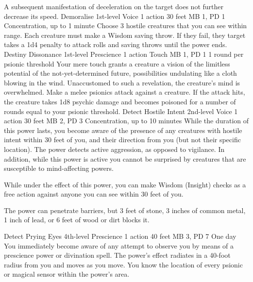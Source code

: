 A subsequent manifestation of deceleration on the target does
not further decrease its speed.
\DndPowerHeader%
    {Demoralise\label{pwr:demoralise}}
    {1st-level Voice}
    {1 action}
    {30 feet}
    {MB 1, PD 1}
    {Concentration, up to 1 minute}
Choose 3 hostile creatures that you can see
within range. Each creature must make a Wisdom saving throw.
If they fail, they target takes a 1d4 penalty to attack rolls
and saving throws until the power ends.
\DndPowerHeader%
    {Destiny Dissonance\label{pwr:destiny_dissonance}}
    {1st-level Prescience}
    {1 action}
    {Touch}
    {MB 1, PD 1}
    {1 round per psionic threshold}
Your mere touch grants a creature a vision
of the limitless potential of the not-yet-determined future,
possibilities undulating like a cloth blowing in the wind.
Unaccustomed to such a revelation, the creature's mind is
overwhelmed. Make a melee psionics attack against a creature.
If the attack hits, the creature takes 1d8 psychic damage
and becomes poisoned for a number of rounds equal to your
psionic threshold.
\DndPowerHeader%
    {Detect Hostile Intent\label{pwr:detect_hostile_intent}}
    {2nd-level Voice}
    {1 action}
    {30 feet}
    {MB 2, PD 3}
    {Concentration, up to 10 minutes}
While the duration of this power lasts, you
become aware of the presence of any creatures with hostile
intent within 30 feet of you, and their direction from you
(but not their specific location). The power detects active
aggression, as opposed to vigilance. In addition, while this
power is active you cannot be surprised by creatures that
are susceptible to mind-affecting powers.

While under the effect of this power, you can make Wisdom
(Insight) checks as a free action against anyone you can see
within 30 feet of you.

The power can penetrate barriers, but 3 feet of stone, 3 inches
of common metal, 1 inch of lead, or 6 feet of wood or dirt
blocks it.

\DndPowerHeader%
    {Detect Prying Eyes\label{pwr:detect_prying_eyes}}
    {4th-level Prescience}
    {1 action}
    {40 feet}
    {MB 3, PD 7}
    {One day}
You immediately become aware of any attempt
to observe you by means of a prescience power or divination
spell. The power's effect radiates in a 40-foot radius from
you and moves as you move. You know the location of every
psionic or magical sensor within the power's area.

